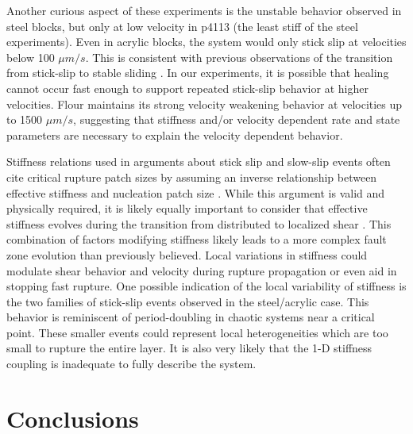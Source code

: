 Another curious aspect of these experiments is the unstable behavior observed in
steel blocks, but only at low velocity in p4113 (the least stiff of the steel
experiments).  Even in acrylic blocks, the system would only stick slip at
velocities below 100 $\mu m/s$.  This is consistent with previous observations
of the transition from stick-slip to stable sliding \cite{Heslot:1994uc}. In our
experiments, it is possible that healing cannot occur fast enough to support
repeated stick-slip behavior at higher velocities.  Flour maintains its strong
velocity weakening behavior at velocities up to 1500 $\mu m/s$, suggesting that
stiffness and/or velocity dependent rate and state parameters are necessary to
explain the velocity dependent behavior.

Stiffness relations used in arguments about stick slip and slow-slip events
often cite critical rupture patch sizes by assuming an inverse relationship
between effective stiffness and nucleation patch size \cite{Ikari_2011}. While
this argument is valid and physically required, it is likely equally important
to consider that effective stiffness evolves during the transition from
distributed to localized shear \cite{Marone2015}. This combination of factors
modifying stiffness likely leads to a more complex fault zone evolution than
previously believed. Local variations in stiffness could modulate shear behavior
and velocity during rupture propagation or even aid in stopping fast rupture.
One possible indication of the local variability of stiffness is the two
families of stick-slip events observed in the steel/acrylic case. This behavior
is reminiscent of period-doubling in chaotic systems near a critical point.
These smaller events could represent local heterogeneities  which are too small
to rupture the entire layer. It is also very likely that the 1-D stiffness
coupling is inadequate to fully describe the system.

\section{Conclusions}

